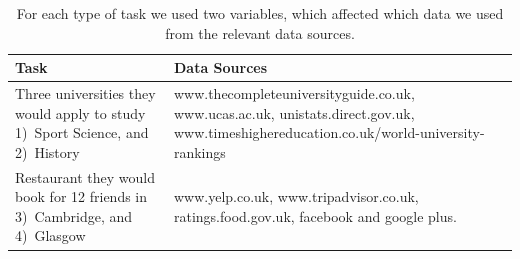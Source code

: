 \documentclass{sigchi}
\begin{document}


\begin{table}[htbp]
\begin{center}
\small
\begin{tabular}{|p{3cm}|p{4.7cm}|}
\hline
Task	 & Data Sources\\
\hline
Three universities they would apply to study 1)~Sport Science, and 2)~History & www.thecompleteuniversityguide.co.uk, www.ucas.ac.uk, unistats.direct.gov.uk, www.timeshighereducation.co.uk/world-university-rankings\\
\hline
Restaurant they would book for 12 friends in 3)~Cambridge, and 4)~Glasgow & www.yelp.co.uk, www.tripadvisor.co.uk, ratings.food.gov.uk, facebook and google plus.\\
\hline
\end{tabular}
\end{center}
\caption{For each type of task we used two variables, which affected which data we used from the relevant data sources.} \label{tab:studyfactors}
\normalsize
\end{table}




\end{document}
